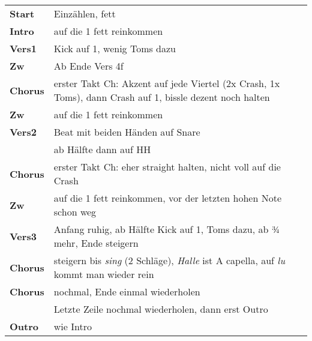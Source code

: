 \begin{tabular}{p{1.6cm}l}
	\textbf{Start}  & Einzählen, fett                                                                                             \\
	\textbf{Intro}  & auf die 1 fett reinkommen                                                                                   \\
	\textbf{Vers1}  & Kick auf 1, wenig Toms dazu                                                                                 \\
	\textbf{Zw}     & Ab Ende Vers 4f                                                                                             \\
	\textbf{Chorus} & erster Takt Ch: Akzent auf jede Viertel (2x Crash, 1x Toms), dann Crash auf 1, bissle dezent noch halten    \\
	\textbf{Zw}     & auf die 1 fett reinkommen                                                                                   \\
	\textbf{Vers2}  & Beat mit beiden Händen auf Snare                                                                            \\
	                & ab Hälfte dann auf HH                                                                                       \\
	\textbf{Chorus} & erster Takt Ch: eher straight halten, nicht voll auf die Crash                                              \\
	\textbf{Zw}     & auf die 1 fett reinkommen, vor der letzten hohen Note schon weg                                             \\
	\textbf{Vers3}  & Anfang ruhig, ab Hälfte Kick auf 1, Toms dazu, ab ¾ mehr, Ende steigern                                     \\
	\textbf{Chorus} & steigern bis \textit{sing} (2 Schläge), \textit{Halle} ist A capella, auf \textit{lu} kommt man wieder rein \\
	\textbf{Chorus} & nochmal, Ende einmal wiederholen                                                                            \\
	                & Letzte Zeile nochmal wiederholen, dann erst Outro                                                           \\
	\textbf{Outro}  & wie Intro                                                                                                   \\
\end{tabular}
